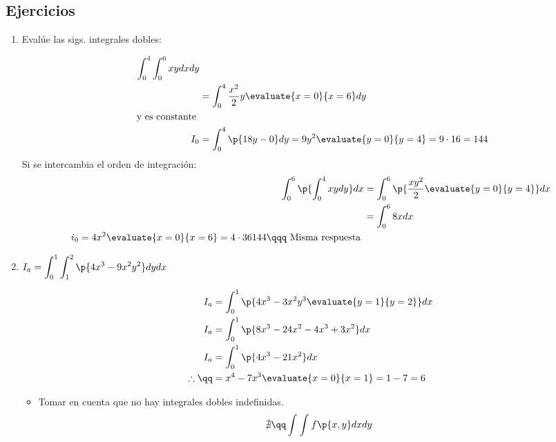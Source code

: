 \subsection{Ejercicios}
\begin{enumerate}
	\item Evalúe las sigs. integrales dobles:
		\begin{center}
		   \begin{align*}
			   \int_{0}^{4}\int_{0}^{6} xy dxdy &\\ 
			   &= \int_{0}^{4} \frac{x^2}{2} y \evaluate{x=0}{x=6} dy \\ \text{ y es constante } \\ 
			   I_0 &= \int_{0}^{4}\p{18y-0} dy = 9y^2 \evaluate{y=0}{y=4} = 9 \cdot 16 = 144 \\ 
		   \end{align*}
		   Si se intercambia el orden de integración:
		   \begin{align*}
			   \int_{0}^{6}\p{\int_{0}^{4}xydy} dx &= \int_{0}^{6}\p{\frac{xy^2}{2} \evaluate{y=0}{y=4} } dx \\ 
			   &= \int_{0}^{6} 8x dx \\ 
			   i_0 = 4x^2 \evaluate{x=0}{x=6} = 4\cdot 36  144 \qqq \text{ Misma respuesta }\\ 
		   \end{align*}
		\end{center}
	
	\item $\displaystyle I_a = \int_{0}^{1}\int_{1}^{2}\p{4x^3-9x^2y^2} dydx$ 
		\begin{center}
		   \begin{align*}
			   I_a &= \int_{0}^{1}\p{4x^3-3x^2y^3\evaluate{y=1}{y=2} } dx \\ 
			   I_a &= \int_{0}^{1}\p{8x^3-24x^2-4x^3+3x^2} dx \\ 
			   I_a &= \int_{0}^{1}\p{4x^3-21x^2} dx \\
			   \therefore \qq  &=  x^4-7x^3 \evaluate{x=0}{x=1} = 1-7 = 6 \\ 
		   \end{align*}
		   \begin{itemize}
			   \item Tomar en cuenta que no hay integrales dobles indefinidas.
			    \[
				  \nexists \qq \int_{}^{}\int_{}^{}f\p{x,y} dxdy
				\]
		   \end{itemize}
		\end{center}
	

\end{enumerate}
